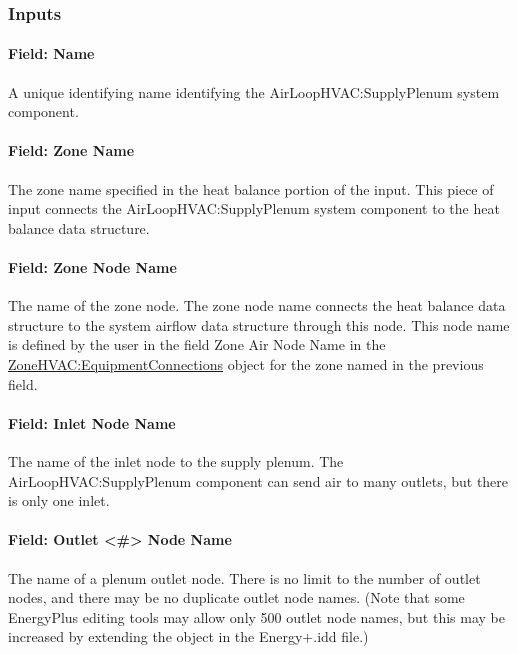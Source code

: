 \subsubsection{Inputs}\label{inputs-3-002}

\paragraph{Field: Name}\label{field-name-3-002}

A unique identifying name identifying the AirLoopHVAC:SupplyPlenum system component.

\paragraph{Field: Zone Name}\label{field-zone-name-1}

The zone name specified in the heat balance portion of the input. This piece of input connects the AirLoopHVAC:SupplyPlenum system component to the heat balance data structure.

\paragraph{Field: Zone Node Name}\label{field-zone-node-name-1}

The name of the zone node. The zone node name connects the heat balance data structure to the system airflow data structure through this node. This node name is defined by the user in the field Zone Air Node Name in the \hyperref[zonehvacequipmentconnections]{ZoneHVAC:EquipmentConnections} object for the zone named in the previous field.

\paragraph{Field: Inlet Node Name}\label{field-inlet-node-name-1}

The name of the inlet node to the supply plenum. The AirLoopHVAC:SupplyPlenum component can send air to many outlets, but there is only one inlet.

\paragraph{Field: Outlet \textless{}\#\textgreater{} Node Name}\label{field-outlet-node-name-1-000}

The name of a plenum outlet node. There is no limit to the number of outlet nodes, and there may be no duplicate outlet node names. (Note that some EnergyPlus editing tools may allow only 500 outlet node names, but this may be increased by extending the object in the Energy+.idd file.)

